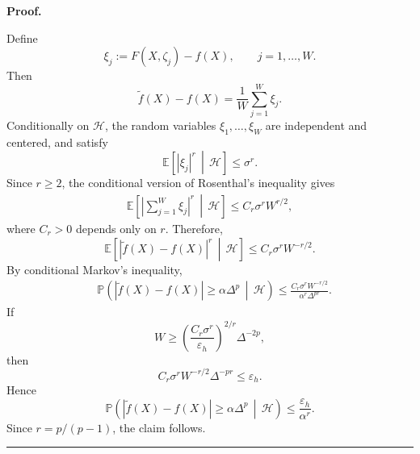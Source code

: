 \documentclass[11pt,a4paper]{article}
\newenvironment{proof}[1][Proof]{%
  \par\noindent\textbf{#1.}\ %
}{%
  \par\vspace{-0.5 ex}            %
  \noindent\hfill\rule{0.5em}{0.5em}\par
  \vspace{1ex}
}
\begin{document}
\begin{proof}
Define
\[
    \xi_j:=F(X,\zeta_j)-f(X),
    \qquad j=1,\ldots,W.
\]
Then
\[
    \tilde f(X)-f(X)
    =
    \frac{1}{W}\sum_{j=1}^{W}\xi_j.
\]
Conditionally on \(\mathcal H\), the random variables
\(\xi_1,\ldots,\xi_W\) are independent and centered, and satisfy
\[
    \mathbb E\!\left[
        |\xi_j|^r
        \,\middle|\,
        \mathcal H
    \right]
    \le\sigma^r.
\]
Since \(r\ge2\), the conditional version of Rosenthal's inequality gives
\[
\begin{aligned}
    \mathbb E\!\left[
        \left|
        \sum_{j=1}^{W}\xi_j
        \right|^r
        \,\middle|\,
        \mathcal H
    \right]
    \le C_r\sigma^r W^{r/2},
\end{aligned}
\]
where \(C_r>0\) depends only on \(r\).
Therefore,
\[
    \mathbb E\!\left[
        |\tilde f(X)-f(X)|^r
        \,\middle|\,
        \mathcal H
    \right]
    \le
    C_r\sigma^r W^{-r/2}.
\]
By conditional Markov's inequality,
\[
\begin{aligned}
    &\mathbb P\!\left(
        |\tilde f(X)-f(X)|
        \ge
        \alpha\Delta^p
        \,\middle|\,
        \mathcal H
    \right)
    \le
    \frac{
        C_r\sigma^r W^{-r/2}
    }{
        \alpha^r\Delta^{pr}
    }.
\end{aligned}
\]
If
\[
    W
    \ge
    \left(
        \frac{C_r\sigma^r}{\varepsilon_h}
    \right)^{2/r}
    \Delta^{-2p},
\]
then
\[
    C_r\sigma^r W^{-r/2}\Delta^{-pr}
    \le\varepsilon_h.
\]
Hence
\[
    \mathbb P\!\left(
        |\tilde f(X)-f(X)|
        \ge
        \alpha\Delta^p
        \,\middle|\,
        \mathcal H
    \right)
    \le
    \frac{\varepsilon_h}{\alpha^r}.
\]
Since \(r=p/(p-1)\), the claim follows.

\end{proof}
\end{document}
